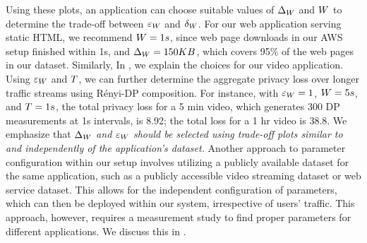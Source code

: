 Using these plots, an application can choose suitable values of $\Delta_{W}$ and $W$ to determine the trade-off between $\varepsilon_{W}$ and $\delta_{W}$.
For our web application serving static HTML, we recommend $W = 1s$, since web page downloads in our AWS setup finished within 1s, and $\Delta_{W} = 150 KB$, which covers 95\% of the web pages in our dataset.
Similarly, In , we explain the choices for our video application.
Using $\varepsilon_{W}$ and $T$, we can further determine the aggregate privacy loss over longer traffic streams using R\'enyi-DP composition.
For instance, with $\varepsilon_{W} = 1$, $W = 5s$, and $T = 1s$, the total privacy loss for a 5 min video, which generates 300 DP measurements at 1s intervals, is 8.92; the total loss for a 1 hr video is 38.8.
We emphasize that {\em $\Delta_{W}$ and $\varepsilon_W$ should be selected using trade-off plots similar to  and  independently of the application's dataset.}
Another approach to parameter configuration within our setup involves utilizing a publicly available dataset for the same application, such as a publicly accessible video streaming dataset or web service dataset.
This allows for the independent configuration of parameters, which can then be deployed within our system, irrespective of users' traffic. This approach, however, requires a measurement study to find proper parameters for different applications. We discuss this in .


